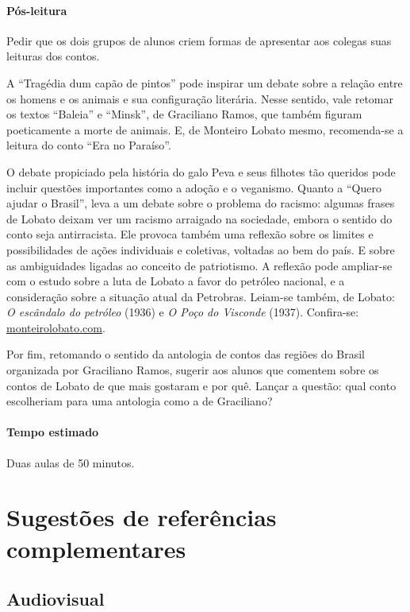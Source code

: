 \documentclass[11pt]{extarticle}
\begin{document}
\asterisc\paragraph{Pós-leitura}

Pedir que os dois grupos de alunos criem formas de apresentar aos
colegas suas leituras dos contos.

A ``Tragédia dum capão de pintos'' pode inspirar um debate sobre a
relação entre os homens e os animais e sua configuração literária. Nesse
sentido, vale retomar os textos ``Baleia'' e ``Minsk'', de Graciliano
Ramos, que também figuram poeticamente a morte de animais. E, de
Monteiro Lobato mesmo, recomenda-se a leitura do conto ``Era no
Paraíso''.

O debate propiciado pela história do galo Peva e seus filhotes tão
queridos pode incluir questões importantes como a adoção e o veganismo.
Quanto a ``Quero ajudar o Brasil'', leva a um debate sobre o problema do
racismo: algumas frases de Lobato deixam ver um racismo arraigado na
sociedade, embora o sentido do conto seja antirracista. Ele provoca
também uma reflexão sobre os limites e possibilidades de ações
individuais e coletivas, voltadas ao bem do país. E sobre as
ambiguidades ligadas ao conceito de patriotismo. A reflexão pode
ampliar-se com o estudo sobre a luta de Lobato a favor do petróleo
nacional, e a consideração sobre a situação atual da Petrobras. Leiam-se
também, de \textbar{}Lobato: \emph{O escândalo do petróleo} (1936) e
\emph{O Poço do Visconde} (1937). Confira-se:
\href{http://www.monteirolobato.com/linha-do-tempo/1931-1939-a-luta-de-lobato-pelo-petroleo-e-ferro}%
{monteirolobato.com}.

Por fim, retomando o sentido da antologia de contos das regiões do
Brasil organizada por Graciliano Ramos, sugerir aos alunos que comentem
sobre os contos de Lobato de que mais gostaram e por quê. Lançar a
questão: qual conto escolheriam para uma antologia como a de Graciliano?

\paragraph{Tempo estimado} Duas aulas de 50 minutos.

\section{Sugestões de referências complementares}

\subsection{Audiovisual}
\end{document}
